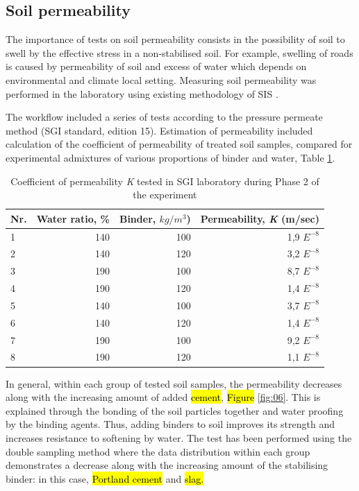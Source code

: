 \documentclass{amestyle}
\begin{document}
\subsection{Soil permeability}
The importance of tests on soil permeability consists in the possibility of soil to swell by the effective stress in a non-stabilised soil. For example, swelling of roads is caused by permeability of soil and excess of water which depends on environmental and climate local setting. Measuring soil permeability was performed in the laboratory using existing methodology of SIS \cite{SIS2019}. 

The workflow included a series of tests according to the pressure permeate method (SGI standard, edition 15). Estimation of permeability included calculation of the coefficient of permeability of treated soil samples, compared for experimental admixtures of various proportions of binder and water, Table \ref{tab:1}.

\begin{table}[htbp]
  \caption{Coefficient of permeability \emph{K} tested in SGI laboratory during Phase 2 of the experiment}
  \label{tab:1}
  \centering
  \begin{tabular}{| l | r | r | r |}
    \hline
    \multicolumn{1}{|c|}{Nr.} &
    \multicolumn{1}{|c|}{Water ratio, \%} &
    \multicolumn{1}{|c|}{Binder, $kg/m^3$)} &
    \multicolumn{1}{|c|}{Permeability, \emph{K} (m/sec) } \\\hline
    1 & 140 & 100 & 1,9 $E^{-8}$ \\
    2 & 140 & 120 & 3,2 $E^{-8}$ \\
    3 & 190 & 100 & 8,7 $E^{-8}$ \\
    4 & 190 & 120 & 1,4 $E^{-8}$ \\
    5 & 140 & 100 & 3,7 $E^{-8}$ \\
    6 & 140 & 120 & 1,4 $E^{-8}$ \\
    7 & 190 & 100 & 9,2 $E^{-8}$ \\
    8 & 190 & 120 & 1,1 $E^{-8}$ \\\hline
  \end{tabular}
\end{table}

In general, within each group of tested soil samples, the permeability decreases along with the increasing amount of added \hl{cement}, \hl{Figure} \ref{fig:06}. This is explained through the bonding of the soil particles together and water proofing by the binding agents. Thus, adding binders to soil improves its strength and increases resistance to softening by water. The test has been performed using the double sampling method where the data distribution within each group demonstrates a decrease along with the increasing amount of the stabilising binder: in this case, \hl{Portland cement} and \hl{slag.} 
\end{document}

